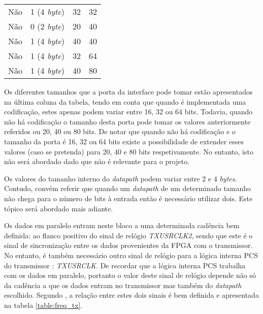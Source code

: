 \begin{table}[h!]
{\begin{tabular}{rlll}
			\multicolumn{1}{r|}{Não}                        & 1 (4 \textit{byte})                                       & 32                                           & 32                                                \\
			\multicolumn{1}{r|}{Não}                        & 0 (2 \textit{byte})                                       & 20                                           & 40                                                \\
			\multicolumn{1}{r|}{Não}                        & 1 (4 \textit{byte})                                       & 40                                           & 40                                                \\
			\multicolumn{1}{r|}{Não}                        & 1 (4 \textit{byte})                                       & 32                                           & 64                                                \\
			\multicolumn{1}{r|}{Não}                        & 1 (4 \textit{byte})                                       & 40                                           & 80                                                \\ \hline
		\end{tabular}%
	}
\end{table}

Os diferentes tamanhos que a porta da interface pode tomar estão apresentados na última coluna da tabela, tendo em conta que quando é implementada uma codificação, estes apenas podem variar entre 16, 32 ou 64 bits. Todavia, quando não há codificação o tamanho desta porta pode tomar os valores anteriormente referidos ou 20, 40 ou 80 bits. De notar que quando não há codificação e o tamanho da porta é 16, 32 ou 64 bits existe a possibilidade de extender esses valores (caso se pretenda) para 20, 40 e 80 bits respetivamente. No entanto, isto não será abordado dado que não é relevante para o projeto. 

Os valores do tamanho interno do \textit{datapath} podem variar entre 2 e 4 \textit{bytes}. Contudo, convém referir que quando um \textit{datapath} de um determinado tamanho não chega para o número de bits à entrada então é necessário utilizar dois. Este tópico será abordado mais adiante.

Os dados em paralelo entram neste bloco a uma determinada cadência bem definida: ao flanco positivo do sinal de relógio \textit{TXUSRCLK2}, sendo que este é o sinal de sincronização entre os dados provenientes da FPGA com o transmissor. No entanto, é também necessário outro sinal de relógio para a lógica interna PCS do transmissor : \textit{TXUSRCLK}. De recordar que a lógica interna PCS trabalha com os dados em paralelo, portanto o valor deste sinal de relógio depende não só da cadência a que os dados entram no transmissor mas também do \textit{datapath} escolhido. Segundo \cite{R011}, a relação entre estes dois sinais é bem definida e apresentada na tabela \ref{table:freq_tx}.

